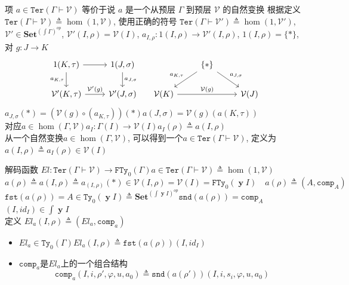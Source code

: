 \documentclass[aspectratio=169,xcolor=dvipsnames]{beamer}
\newcommand\calV{\mathcal{V}}
\newcommand\FTy{\mathtt{FTy}}
\newcommand\comp{\mathtt{comp}}
\newcommand\fst{\mathtt{fst}}
\newcommand\snd{\mathtt{snd}}
\newcommand\Ty{\mathtt{Ty}}
\newcommand\Ter{\mathtt{Ter}}
\newcommand\Set{\mathbf{Set}}
\DeclareMathOperator\y{\mathbf{y}}
\begin{document}
\begin{frame}{项 $a ∈ \Ter(Γ ⊢ \calV)$ 等价于说 $a$ 是一个从预层 $Γ$ 到预层 $\calV$ 的自然变换}
  根据定义 $\Ter(\Gamma\vdash \calV)\triangleq\hom(1,\calV)$, 使用正确的符号 $\Ter(\Gamma\vdash \calV')\triangleq\hom(1,\calV')$, $\calV'\in\Set^{(\int\Gamma)^{op}}$, $\calV'(I,\rho)=\calV(I)$, $a_{I,\rho}:1(I,\rho)\to\calV'(I,\rho)$, $1(I,\rho)=\{\ast\}$, 对 $g:J\to K$
  \[
  \begin{tabular}{cc}
  \begin{tikzcd}
  1(K,\tau) \arrow[d,"{a_{K,\tau}}"'] \arrow[r] & 1(J,\sigma) \arrow[d,"{a_{J,\sigma}}"]\\
  \calV'(K,\tau) \arrow[r,"{\calV'(g)}"] & \calV'(J,\sigma)
  \end{tikzcd}
&
  \begin{tikzcd}
    & \{\ast\} \arrow[dl,"{a_{K,\tau}}"'] \arrow[dr,"{a_{J,\sigma}}"] & \\
    \calV(K) \arrow[rr,"{\calV(g)}"] & & \calV(J)
  \end{tikzcd}
\end{tabular} \]
  $a_{J,\sigma}(\ast) = (\calV(g)\circ(a_{K,\tau}))(\ast)$\quad$a(J,\sigma)=\calV(g)(a(K,\tau))$\\
  对应$a\in\hom(\Gamma,\calV)$\quad$a_I:\Gamma(I)\to\calV(I)$\quad$a_I(\rho)\triangleq a(I,\rho)$\\
  从一个自然变换$a\in\hom(\Gamma,\calV)$, 可以得到一个$a\in\Ter(\Gamma\vdash\calV)$, 定义为$a(I,\rho)\triangleq a_I(\rho)\in\calV(I)$
\end{frame}

\begin{frame}{解码函数}
    $El : \Ter(\Gamma\vdash\calV)\to\FTy_{0}(\Gamma)$\quad $a\in\Ter(\Gamma\vdash\calV)\triangleq\hom(1,\calV)$\quad $a(\rho)\triangleq a(I,\rho)\triangleq a_{(I,\rho)}(\ast)\in\calV(I,\rho)=\calV(I)=\FTy_{0}(\y I)\quad a(\rho)\triangleq(A,\comp_{A})$
  $\fst(a(\rho)) = A \in \Ty_0(\y I)\triangleq\Set^{(\int\y I)^{op}}$\quad $\snd(a(\rho)) = \comp_{A}$\quad $(I,id_I)\in\int\y I$\\
  定义 $El_a(I,\rho)\triangleq(El_{a},\comp_{a})$
  \begin{itemize}
    \item $El_a\in\Ty_{0}(\Gamma)$\quad $El_a(I,\rho)\triangleq\fst(a(\rho))(I,id_I)$
    \item $\comp_a$是$El_a$上的一个组合结构\[\comp_a(I,i,\rho',\varphi,u,a_{0})\triangleq\snd(a(\rho'))(I,i,s_i,\varphi,u,a_0)\]
  \end{itemize}

\end{frame}
\end{document}
